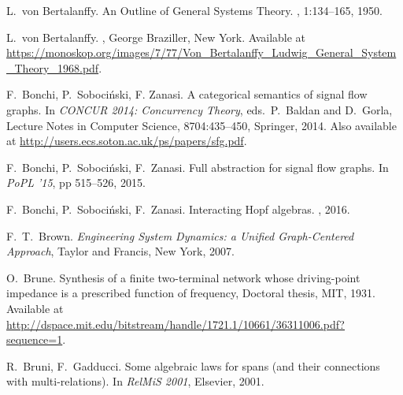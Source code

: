 \begin{thebibliography}{RSW00}
    L.\ von Bertalanffy. 
    \newblock An Outline of General Systems Theory.
    , 1:134--165,
    1950.
    
    L.\ von Bertalanffy. 
    ,
    George Braziller, New York.
    \newblock Available at
    \href{https://monoskop.org/images/7/77/Von_Bertalanffy_Ludwig_General_System_Theory_1968.pdf}{https://monoskop.org/images/7/77/Von\_Bertalanffy\_Ludwig\_General\_System\_Theory\_1968.pdf}.

    F.\ Bonchi, P.\ Soboci\'nski, F. Zanasi.
    \newblock A categorical semantics of signal flow graphs.
    \newblock In \emph{CONCUR 2014: Concurrency Theory}, eds.\ P.\ Baldan and
    D.\ Gorla, Lecture Notes in Computer Science, 8704:435--450, Springer, 2014.
    \newblock Also available at
    \href{http://users.ecs.soton.ac.uk/ps/papers/sfg.pdf}
    {http://users.ecs.soton.ac.uk/ps/papers/sfg.pdf}.
    
    F.\ Bonchi, P.\ Soboci\'nski, F.\ Zanasi.
    \newblock Full abstraction for signal flow graphs.
    \newblock In \emph{PoPL '15}, pp 515--526, 2015.

    F.\ Bonchi, P.\ Soboci\'nski, F.\ Zanasi.
    \newblock Interacting Hopf algebras.
    , 2016.



    F.\ T.\ Brown.
    \newblock \textsl{Engineering System Dynamics: a 
    Unified Graph-Centered Approach}, Taylor and Francis, New York, 2007. 

    O.\ Brune.
    \newblock Synthesis of a finite two-terminal network whose
    driving-point impedance is a prescribed function of frequency, Doctoral
    thesis, MIT, 1931.
    \newblock Available at
    \href{http://dspace.mit.edu/bitstream/handle/1721.1/10661/36311006.pdf?sequence=1}
    {http://dspace.mit.edu/bitstream/handle/1721.1/10661/36311006.pdf?sequence=1}.

    R.\ Bruni, F.\ Gadducci.
    \newblock Some algebraic laws for spans (and their
    connections with multi-relations).
    \newblock In \textsl{RelMiS 2001}, Elsevier, 2001.


\end{thebibliography}
